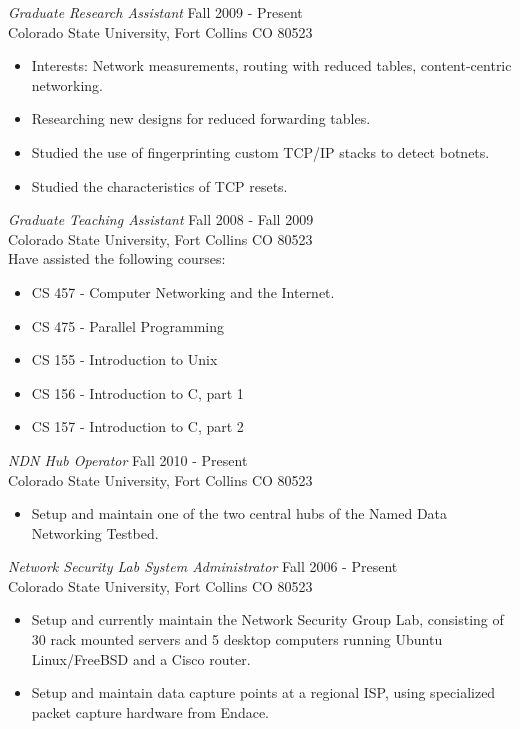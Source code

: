 \documentclass[line,margin]{res}
\begin{document}
\begin{resume}
    {\sl Graduate Research Assistant} \hfill Fall 2009 - Present\\
        Colorado State University, Fort Collins CO 80523
        \begin{itemize}  \itemsep -2pt
            \item Interests: Network measurements, routing with reduced tables, content-centric networking.
            \item Researching new designs for reduced forwarding tables.
            \item Studied the use of fingerprinting custom TCP/IP stacks to detect botnets.
            \item Studied the characteristics of TCP resets.
        \end{itemize}
  
   {\sl Graduate Teaching Assistant} \hfill Fall 2008 - Fall 2009\\
        Colorado State University, Fort Collins CO 80523\\
        Have assisted the following courses:
        \begin{itemize}  \itemsep -2pt
            \item CS 457 - Computer Networking and the Internet.
            \item CS 475 - Parallel Programming
            \item CS 155 - Introduction to Unix
            \item CS 156 - Introduction to C, part 1
            \item CS 157 - Introduction to C, part 2
         \end{itemize}

    {\sl NDN Hub Operator} \hfill {Fall 2010 - Present}\\
     	Colorado State University, Fort Collins CO 80523
	\begin{itemize} \itemsep -2pt
		\item Setup and maintain one of the two central hubs of the Named Data
		Networking Testbed.
	\end{itemize}

    {\sl Network Security Lab System Administrator} \hfill Fall 2006 - Present\\
        Colorado State University, Fort Collins CO 80523
        \begin{itemize} \itemsep -2pt
            \item Setup and currently maintain the Network Security Group Lab, 
            consisting of 30 rack mounted servers and 5 desktop computers
            running Ubuntu Linux/FreeBSD and a Cisco router.
            \item Setup and maintain data capture points at a regional ISP, using
            specialized packet capture hardware from Endace.
        \end{itemize}
	 

\end{resume}
\end{document}
